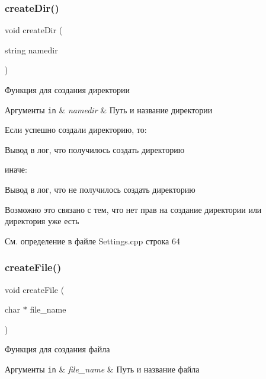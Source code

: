 \subsubsection{\texorpdfstring{create\+Dir()}{createDir()}}
{\footnotesize\ttfamily void create\+Dir (\begin{DoxyParamCaption}\item[{string}]{namedir }\end{DoxyParamCaption})}



Функция для создания директории 


\begin{DoxyParams}[1]{Аргументы}
\mbox{\tt in}  & {\em namedir} & Путь и название директории \\
\hline
\end{DoxyParams}
Если успешно создали директорию, то\+: \begin{DoxyVerb}Вывод в лог, что получилось создать директорию
\end{DoxyVerb}


иначе\+: \begin{DoxyVerb}Вывод в лог, что не получилось создать директорию

Возможно это связано с тем, что нет прав на создание директории или директория уже есть  \end{DoxyVerb}


См. определение в файле Settings.\+cpp строка 64

\mbox{\label{group__settingscpp_ga8f34a2030acfb5567678ab2bba25f3c1}} 
\subsubsection{\texorpdfstring{create\+File()}{createFile()}}
{\footnotesize\ttfamily void create\+File (\begin{DoxyParamCaption}\item[{char $\ast$}]{file\+\_\+name }\end{DoxyParamCaption})}



Функция для создания файла 


\begin{DoxyParams}[1]{Аргументы}
\mbox{\tt in}  & {\em file\+\_\+name} & Путь и название файла \\
\hline
\end{DoxyParams}


